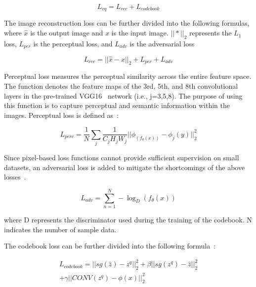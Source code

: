 \documentclass[journal]{IEEEtran}
\begin{document}
\begin{equation}
	\label{vq_loss}
	L_{vq} = L_{rec} + L_{codebook}
\end{equation}

The image reconstruction loss can be further divided into the following formulas, where $\hat{x}$ is the output image and $x$ is the input image. $|| * ||_{2}$ represents the $L_{1}$ loss, $L_{per}$ is the perceptual loss, and $L_{adv}$ is the adversarial loss

\begin{equation}
	\label{reconstruction_loss}
	L_{rec} = || \hat{x} - x ||_{2} + L_{per} + L_{adv}
\end{equation}

Perceptual loss measures the perceptual similarity across the entire feature space. The function denotes the feature maps of the 3rd, 5th, and 8th convolutional layers in the pre-trained VGG16~\cite{simonyan2014very} network (i.e., j=3,5,8). The purpose of using this function is to capture perceptual and semantic information within the images. Perceptual loss is defined as~\cite{johnson2016perceptual}:

\begin{equation}
	\label{perceptual_loss}
	L_ {perc} = \frac{1}{N} \sum_{j} \frac{1}{C_{j}H_{j}W_{j}} || \phi_(f_{\theta}(x)) - \phi_{j}(y)||_{2}^{2}
\end{equation}

Since pixel-based loss functions cannot provide sufficient supervision on small datasets, an adversarial loss is added to mitigate the shortcomings of the above losses~\cite{zhu2017unpaired}.

\begin{equation}
	\label{adversarial_loss}
	L_{adv} = \sum_{n=1}^{N} - \log_{D} (f_{\theta}(x))
\end{equation}

\noindent where D represents the discriminator used during the training of the codebook. N indicates the number of sample data.


The codebook loss can be further divided into the following formula~\cite{chen2022real}:

\begin{equation}
	\label{codebook_loss}
	\begin{split}
		L_ {codebook} = || sg(\widehat{z}) - z^ {q} ||_{2}^{2} + \beta ||sg(z^{q})- \widehat{z}||_{2}^{2} \\
		+ \gamma ||CONV(z^{q}) - \phi(x)||_{2}^{2}
	\end{split}
\end{equation}
\end{document}
